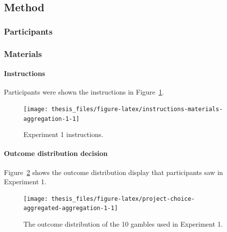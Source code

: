 \documentclass[a4paper, nobind, dvipsnames]{templates/ociamthesis}
\theoremstyle{definition}
\theoremstyle{definition}
\theoremstyle{definition}
\theoremstyle{definition}
\theoremstyle{remark}
\begin{document}
\hypertarget{method-6}{%
\subsection{Method}\label{method-6}}

\hypertarget{participants-7}{%
\subsubsection{Participants}\label{participants-7}}

\hypertarget{materials-5}{%
\subsubsection{Materials}\label{materials-5}}

\hypertarget{instructions-materials-aggregation-1-appendix}{%
\paragraph{Instructions}\label{instructions-materials-aggregation-1-appendix}}

Participants were shown the instructions in
Figure~\ref{fig:instructions-materials-aggregation-1}.



\begin{figure}
\texttt{[image: thesis\_files/figure-latex/instructions-materials-aggregation-1-1]} \caption{Experiment 1 instructions.}\label{fig:instructions-materials-aggregation-1}
\end{figure}

\hypertarget{outcome-distribution-materials-aggregation-1-appendix}{%
\paragraph{Outcome distribution decision}\label{outcome-distribution-materials-aggregation-1-appendix}}

Figure~\ref{fig:project-choice-aggregated-aggregation-1} shows the outcome
distribution display that participants saw in Experiment 1.



\begin{figure}
\texttt{[image: thesis\_files/figure-latex/project-choice-aggregated-aggregation-1-1]} \caption{The outcome distribution of the 10 gambles used in Experiment 1.}\label{fig:project-choice-aggregated-aggregation-1}
\end{figure}
\end{document}

